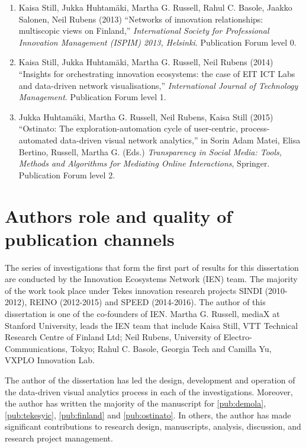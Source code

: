 \begin{midsloppypar}
\begin{enumerate}[label=\textbf{Publication \Roman*},align=left]
  \item Kaisa Still, Jukka Huhtamäki, Martha G. Russell, Rahul C. Basole, Jaakko Salonen, Neil Rubens
  (2013)
  ``Networks of innovation relationships: multiscopic views on Finland,''
  \emph{International Society for Professional Innovation Management (ISPIM) 2013, Helsinki}.
  Publication Forum level 0.
  \label{pub:multiscopicfinland}

  \item Kaisa Still, Jukka Huhtamäki, Martha G. Russell, Neil Rubens
  (2014)
  ``Insights for orchestrating innovation ecosystems: the case of EIT ICT Labs and data-driven network visualisations,''
  \emph{International Journal of Technology Management}.
  Publication Forum level 1. 
  \label{pub:eitictlabs}
  
  \item Jukka Huhtamäki, Martha G. Russell, Neil Rubens, Kaisa Still 
  (2015) 	
  ``Ostinato: The exploration-automation cycle of user-centric, process-automated data-driven visual network analytics,'' in Sorin Adam Matei,
Elisa Bertino, Russell, Martha G. (Eds.) \emph{Transparency in Social Media: Tools, Methods and Algorithms for Mediating Online Interactions},
  Springer. Publication Forum level 2.
  \label{pub:ostinato}
  
\end{enumerate}

\section{Authors role and quality of publication channels}

The series of investigations that form the first part of results for this dissertation are conducted by the Innovation Ecosystems Network (IEN) team. The majority of the work took place under Tekes innovation research projects SINDI (2010-2012), REINO (2012-2015) and SPEED (2014-2016). The author of this dissertation is one of the co-founders of IEN. Martha G. Russell, mediaX at Stanford University, leads the IEN team that include Kaisa Still, VTT Technical Research Centre of Finland  Ltd; Neil Rubens, University of Electro-Communications, Tokyo; Rahul C. Basole, Georgia Tech and Camilla Yu, VXPLO Innovation Lab.

The author of the dissertation has led the design, development and operation of the data-driven visual analytics process in each of the investigations. Moreover, the author has written the majority of the manuscript for \ref{pub:demola}, \ref{pub:tekesyic}, \ref{pub:finland} and \ref{pub:ostinato}. In others, the author has made significant contributions to research design, manuscripts, analysis, discussion, and research project management.


\end{midsloppypar}

